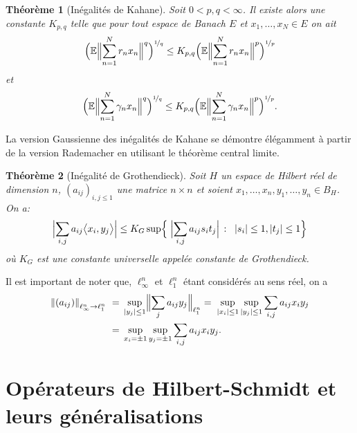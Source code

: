 \documentclass{smfart}
\theoremstyle{plain}
\newtheorem{theorem}{Théorème}[section]
\theoremstyle{definition}
\newcommand{\EE}{\mathbb E}
\newcommand {\SUCHTHAT} {\,:\;}
\newcommand {\Bignorm}[1]{\Bigl\| #1 \Bigr\|}
\begin{document}
\begin{theorem}[Inégalités de Kahane]\label{thm:kahane}
  Soit $0 < p,q < \infty$. Il existe alors une constante $K_{p,q}$
  telle que pour tout espace de Banach $E$ et $x_1, \ldots, x_N \in E$ on ait
\[
   \Bigl( \EE \Bignorm{ \sum_{n=1}^N r_n x_n }^q \Bigr)^{\nicefrac1q} \le K_{p,q} \Bigl( \EE \Bignorm{ \sum_{n=1}^N r_n x_n }^p \Bigr)^{\nicefrac1p}
\]
et 
\[
   \Bigl( \EE \Bignorm{ \sum_{n=1}^N \gamma_n x_n }^q \Bigr)^{\nicefrac1q} \le K_{p,q} \Bigl( \EE \Bignorm{ \sum_{n=1}^N \gamma_n x_n }^p \Bigr)^{\nicefrac1p}.
\]
\end{theorem}

\noindent La version Gaussienne des inégalités de Kahane se démontre
élégamment à partir de la version Rademacher en utilisant le théorème central  limite.

\begin{theorem}[Inégalité de Grothendieck]\label{thm:grothendieck-ineq}
  Soit $H$ un espace de Hilbert réel de dimension $n$, 
  $(a_{ij})_{i,j\leq 1}$ une matrice $n{\times}n$ et soient $x_1,
  \ldots,x_n, y_1, \ldots ,y_n \in B_H$. On a:
\[
    \Bigl|\sum_{i,j} a_{ij}\bigl\langle x_i,y_j\bigr\rangle\Bigr|
\leq 
    K_G \sup \Bigl\{\; \Bigl|  \sum_{i,j}a_{ij} s_i t_j \Bigr| \SUCHTHAT \; |s_i|\leq 1, |t_j| \leq 1 \Bigr\}
\] 
où $K_G$ est une constante universelle appelée constante de
Grothendieck.
\end{theorem}

\noindent Il est important de noter que, $\ell_{\infty}^n$ et
$\ell_1^n$ étant considérés au sens réel, on a
\begin{align*}
\left\|\left(a_{ij}\right)\right\|_{\ell_{\infty}^n\rightarrow\ell_{1}^n}\
=& \; \sup_{\left|y_j\right|\leq 1}\Bigl\|\sum_j a_{ij}y_j\Bigr\|_{\ell_1^n}
= \; \sup_{\left|x_i\right|\leq 1} \sup_{\left|y_j\right|\leq 1}\sum_{i,j}a_{ij}x_i y_j\\
=& \; \sup_{x_i=\pm1}\sup_{y_j=\pm1}\sum_{i,j}a_{ij}x_i y_j.
\end{align*}









\section{Opérateurs de Hilbert-Schmidt et leurs généralisations}
\end{document}

